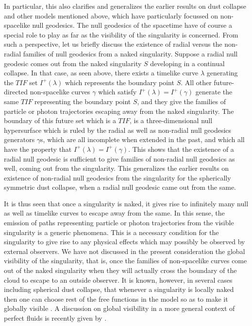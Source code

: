 \documentclass[twocolumn,aps,amsmath,amssymb,prl,showpacs,preprintnumbers]
{revtex4}
\begin{document}
In particular, this also clarifies and generalizes the earlier 
results on dust collapse and other models mentioned above, which have 
particularly focussed on non-spacelike null geodesics. The null 
geodesics of the spacetime have of course a special role to play as 
far as the visibility of the singularity is concerned. From such a 
perspective, let us briefly discuss the existence of radial versus the 
non-radial families of null geodesics from a naked singularity. 
Suppose a radial null geodesic comes out from the naked singularity $S$ 
developing in a continual collapse. In that case, as seen above, 
there exists a timelike curve $\lambda$ generating the $TIF$ 
set $I^{+}(\lambda)$ which represents the boundary point $S$. All other 
future-directed non-spacelike curves $\gamma$ which 
satisfy  $I^{+}(\lambda) = I^+(\gamma)$ generate the same $TIF$ 
representing the boundary point $S$, and they give the families
of particle or photon trajectories escaping away from the naked
singularity. The boundary of this future set which is a $TIF$, is
a three-dimensional null hypersurface which is ruled by the radial as well 
as non-radial null geodesics generators $\gamma$s, which are all 
incomplete when extended in the past, and which all have the property 
that  $I^{+}(\lambda) =  I^{+}(\gamma)$. This shows that the existence 
of a radial null geodesic is sufficient to give families of non-radial 
null geodesics as well, coming out from the singularity. This generalizes 
the earlier results on existence of non-radial null geodesics from 
the singularity for the spherically symmetric dust collapse, when a 
radial null geodesic came out from the same.



It is thus seen that once a singularity is naked, it gives
rise to infinitely many null as well as timelike curves to escape
away from the same. In this sense, the emission of paths representing 
particle or photon trajectories from the visible singularity is a generic 
phenomena. This is a necessary condition for the singularity to give 
rise to any physical effects which may possibly be observed by 
external observers. We have not discussed in the present consideration  
the global visibility of the singularity, that is, once the families
of non-spacelike curves come out of the naked singularity when they 
will actually cross the boundary of the cloud to escape to an outside 
observer. It is known, however, in several cases including spherical 
dust collapse, that whenever a singularity is locally naked then 
one can choose rest of the free functions in the model so as to make 
it globally visible
\cite{remark}.   
A discussion on global visibility in a more general context 
of perfect fluids is recently given by
\cite{giambo}.
\end{document}
